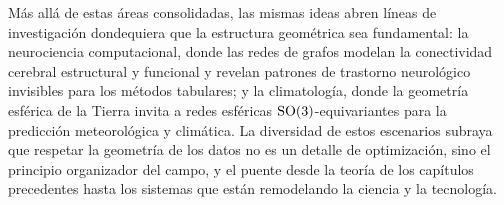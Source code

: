M\'as all\'a de estas \'areas consolidadas, las mismas ideas abren l\'ineas de
investigaci\'on dondequiera que la estructura geom\'etrica sea fundamental: la
neurociencia computacional, donde las redes de grafos modelan la conectividad
cerebral estructural y funcional y revelan patrones de trastorno neurol\'ogico
invisibles para los m\'etodos tabulares; y la climatolog\'ia, donde la geometr\'ia
esf\'erica de la Tierra invita a redes esf\'ericas $\mathrm{SO}(3)$-equivariantes para la
predicci\'on meteorol\'ogica y clim\'atica. La diversidad de estos escenarios
subraya que respetar la geometr\'ia de los datos no es un detalle de
optimizaci\'on, sino el principio organizador del campo, y el puente desde la
teor\'ia de los cap\'itulos precedentes hasta los sistemas que est\'an
remodelando la ciencia y la tecnolog\'ia.
